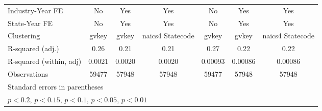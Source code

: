 {\begin{tabular}{l*{6}{c}}
\addlinespace
Industry-Year FE    &          No         &         Yes         &         Yes         &          No         &         Yes         &         Yes         \\
\addlinespace
State-Year FE       &          No         &         Yes         &         Yes         &          No         &         Yes         &         Yes         \\
\midrule
Clustering          &       gvkey         &       gvkey         &naics4 Statecode         &       gvkey         &       gvkey         &naics4 Statecode         \\
R-squared (adj.)    &        0.26         &        0.21         &        0.21         &        0.27         &        0.22         &        0.22         \\
R-squared (within, adj)&      0.0021         &      0.0020         &      0.0020         &     0.00093         &     0.00086         &     0.00086         \\
Observations        &       59477         &       57948         &       57948         &       59477         &       57948         &       57948         \\
\bottomrule
\multicolumn{7}{l}{\footnotesize Standard errors in parentheses}\\
\multicolumn{7}{l}{\footnotesize \sym{++} \(p<0.2\), \sym{+} \(p<0.15\), \sym{*} \(p<0.1\), \sym{**} \(p<0.05\), \sym{***} \(p<0.01\)}\\
\end{tabular}
}
